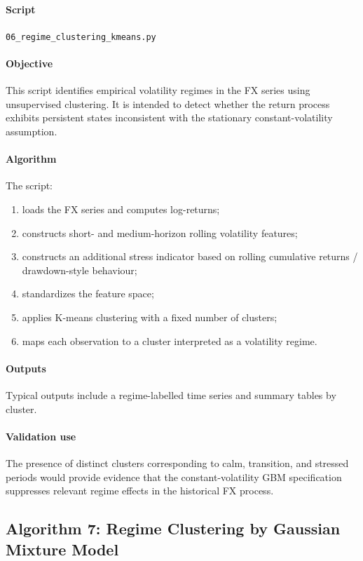 	\paragraph{Script}
	\texttt{06\_regime\_clustering\_kmeans.py}
	
	\paragraph{Objective}
	This script identifies empirical volatility regimes in the FX series using unsupervised clustering. It is intended to detect whether the return process exhibits persistent states inconsistent with the stationary constant-volatility assumption.
	
	\paragraph{Algorithm}
	The script:
	\begin{enumerate}
		\item loads the FX series and computes log-returns;
		\item constructs short- and medium-horizon rolling volatility features;
		\item constructs an additional stress indicator based on rolling cumulative returns / drawdown-style behaviour;
		\item standardizes the feature space;
		\item applies K-means clustering with a fixed number of clusters;
		\item maps each observation to a cluster interpreted as a volatility regime.
	\end{enumerate}
	
	\paragraph{Outputs}
	Typical outputs include a regime-labelled time series and summary tables by cluster.
	
	\paragraph{Validation use}
	The presence of distinct clusters corresponding to calm, transition, and stressed periods would provide evidence that the constant-volatility GBM specification suppresses relevant regime effects in the historical FX process.
	
	\subsection{Algorithm 7: Regime Clustering by Gaussian Mixture Model}
	
